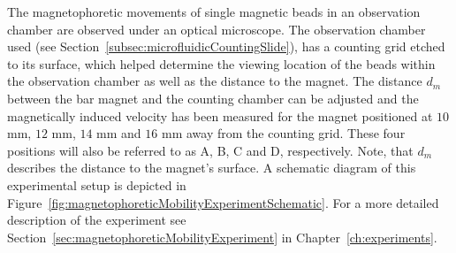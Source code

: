The magnetophoretic movements of single magnetic beads in an observation chamber are observed under an optical microscope. The observation chamber used (see Section~\ref{subsec:microfluidicCountingSlide}), has a counting grid etched to its surface, which helped determine the viewing location of the beads within the observation chamber as well as the distance to the magnet. The distance $d_{m}$ between the bar magnet and the counting chamber can be adjusted and the magnetically induced velocity has been measured for the magnet positioned at $10$ mm, $12$ mm, $14$ mm and $16$ mm away from the counting grid. These four positions will also be referred to as A, B, C and D, respectively. Note, that $d_{m}$ describes the distance to the magnet's surface. A schematic diagram of this experimental setup is depicted in Figure~\ref{fig:magnetophoreticMobilityExperimentSchematic}. For a more detailed description of the experiment see Section~\ref{sec:magnetophoreticMobilityExperiment} in Chapter~\ref{ch:experiments}.

